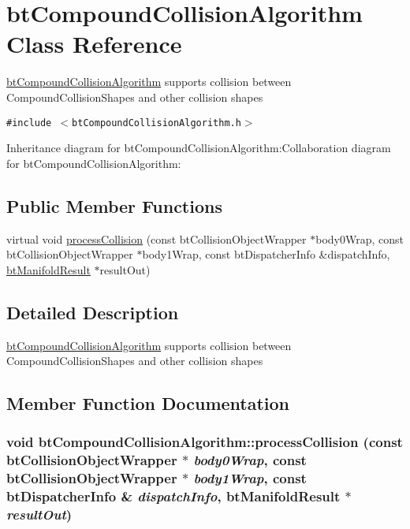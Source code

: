 \hypertarget{classbt_compound_collision_algorithm}{
\section{btCompoundCollisionAlgorithm Class Reference}
\label{classbt_compound_collision_algorithm}
}
\hyperlink{classbt_compound_collision_algorithm}{btCompoundCollisionAlgorithm} supports collision between CompoundCollisionShapes and other collision shapes  


{\tt \#include $<$btCompoundCollisionAlgorithm.h$>$}

Inheritance diagram for btCompoundCollisionAlgorithm:Collaboration diagram for btCompoundCollisionAlgorithm:\subsection*{Public Member Functions}
\begin{CompactItemize}
\item 
virtual void \hyperlink{classbt_compound_collision_algorithm_173ce993461795e0572dd2924c54cdc0}{processCollision} (const btCollisionObjectWrapper $\ast$body0Wrap, const btCollisionObjectWrapper $\ast$body1Wrap, const btDispatcherInfo \&dispatchInfo, \hyperlink{classbt_manifold_result}{btManifoldResult} $\ast$resultOut)
\end{CompactItemize}


\subsection{Detailed Description}
\hyperlink{classbt_compound_collision_algorithm}{btCompoundCollisionAlgorithm} supports collision between CompoundCollisionShapes and other collision shapes 

\subsection{Member Function Documentation}
\hypertarget{classbt_compound_collision_algorithm_173ce993461795e0572dd2924c54cdc0}{
\subsubsection[processCollision]{\setlength{\rightskip}{0pt plus 5cm}void btCompoundCollisionAlgorithm::processCollision (const btCollisionObjectWrapper $\ast$ {\em body0Wrap}, \/  const btCollisionObjectWrapper $\ast$ {\em body1Wrap}, \/  const btDispatcherInfo \& {\em dispatchInfo}, \/  {\bf btManifoldResult} $\ast$ {\em resultOut})}}
\label{classbt_compound_collision_algorithm_173ce993461795e0572dd2924c54cdc0}




